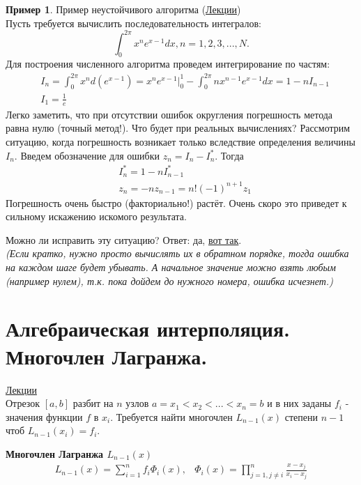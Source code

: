 \documentclass[specialist, subf, href, colorlinks=true, 12pt, times, mtpro, final]{disser}
\theoremstyle{definition}
\newtheorem{example}{Пример}[section]
\begin{document}
    \begin{example}
        Пример неустойчивого алгоритма (\hyperlink {lects.14}{Лекции})\\
        Пусть требуется вычислить последовательность интегралов:
        $$
            \int_0^{2\pi}{x^n e^{x-1}dx}, n = 1,2,3,...,N.
        $$
        Для построения численного алгоритма проведем интегрирование по частям:
        $$
        \begin{aligned}
            & I_n = \int_0^{2\pi}{x^n d(e^{x-1})} = x^n e^{x-1} \big|_0^1 - \int_0^{2\pi}{n x^{n-1} e^{x-1}dx} = 1 - n  I_{n-1} \\
            & I_1 = \frac{1}{e}
        \end{aligned}
        $$
        Легко заметить, что при отсутствии ошибок округления погрешность метода равна нулю (точный метод!). Что будет при реальных вычислениях? Рассмотрим ситуацию, когда погрешность возникает только вследствие определения величины $I_n$. Введем обозначение для ошибки $z_n = I_n - I_n^*$. Тогда
        $$
        \begin{aligned}
            & I_n^* = 1 - n I_{n-1}^* \\
            & z_n = - n z_{n-1} = n! (-1)^{n+1} z_1
        \end{aligned}
        $$
        Погрешность очень быстро (факториально!) растёт. Очень скоро это приведет к сильному искажению искомого результата.
    \end{example}
    \noindent Можно ли исправить эту ситуацию? Ответ: да, \hyperlink {lects.15}{вот так}.\\
    {\it(Если кратко, нужно просто вычислять их в обратном
    порядке, тогда ошибка на каждом шаге будет убывать. А начальное значение можно взять
    любым (например нулем), т.к. пока дойдем до нужного номера, ошибка исчезнет.)}

\section {Алгебраическая интерполяция. Многочлен Лагранжа.}
    \hyperlink {lects.15}{Лекции}\\
    Отрезок $[a,b]$ разбит на $n$ узлов $a = x_1 < x_2 < ... < x_n = b$ и в них заданы $f_i$ - значения функции $f$ в $x_i$. Требуется найти многочлен $L_{n-1}(x)$ степени $n - 1$ чтоб $L_{n - 1}(x_i) = f_i$.

    \noindent\textbf{Многочлен Лагранжа $L_{n - 1}(x)$}
    $$
        \begin {array}{lr}
        L_{n - 1}(x) = \sum\limits_{i = 1}^{n} f_i \Phi_i (x), & \Phi_i(x) = \prod\limits_{j = 1, j\ne i}^{n} \frac{x-x_j}{x_i - x_j} \\
        \end {array}
    $$
\end{document}
